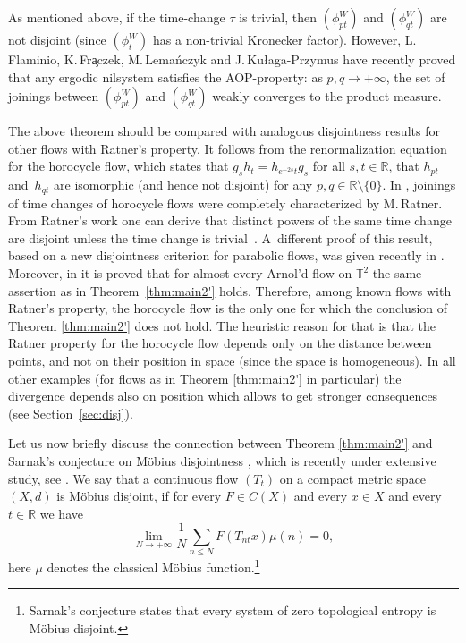 \documentclass[10pt]{amsart}
\theoremstyle{definition}
\theoremstyle{plain}
\newcommand\RR{\mathbb{R}}
\newcommand\TT{\mathbb{T}}
\begin{document}
As mentioned above, if the time-change $\tau$
is trivial, then $(\phi_{pt}^{W})$ and $(\phi_{qt}^{W})$ are not disjoint (since $(\phi_t^W)$ has a non-trivial Kronecker factor). However, L.\,Flaminio, K.\,Fr{\selectfont\c{a}}czek, M.\,Lema{\'n}czyk and J.\,Ku{\l}aga-Przymus \cite{FFKL} have recently proved that any ergodic nilsystem satisfies the AOP-property: as $p,q\to +\infty$, the set of joinings between $(\phi_{pt}^{W})$ and $(\phi_{qt}^{W})$ weakly converges to the product measure.

The above theorem should be compared with analogous disjointness results for other flows with Ratner's property. It follows from the renormalization equation for the horocycle flow, which states that $g_sh_t=h_{e^{-2s}t}g_s$ for all $s,t\in \RR$, that $h_{pt}$ and~$h_{qt}$ are isomorphic (and hence not disjoint) for any $p,q\in \RR\setminus\{0\}$. In \cite{Rat2}, joinings of time changes of horocycle flows were completely characterized by
M.\,Ratner. From Ratner's work one can derive that distinct powers of the same time change are disjoint unless the time change is trivial~\cite{FlaFo2}. A~different proof of this result, based on a new disjointness criterion for parabolic flows, was given recently in \cite{KLU}. Moreover, in \cite{KLU} it is proved that for almost every Arnol'd flow on $\TT^2$ the same assertion as in Theorem~\ref{thm:main2'} holds. Therefore, among known flows with Ratner's property, the horocycle flow is the only one for which the conclusion of Theorem \ref{thm:main2'} does not hold. The heuristic reason for that is that the Ratner property for the horocycle flow depends only on the distance between points, and not on their position in space (since the space is homogeneous). In all other examples (for flows as in Theorem \ref{thm:main2'} in particular) the divergence depends also on position which allows to get stronger consequences (see Section~\ref{sec:disj}).

Let us now briefly discuss the connection between Theorem \ref{thm:main2'} and Sarnak's conjecture on Möbius disjointness \cite{Sar}, which is recently under extensive study, see \eg \cite{FKL}. We say that a continuous flow $(T_t)$ on a compact metric space $(X,d)$ is Möbius disjoint, if for every $F\in C(X)$ and every $x\in X$ and every $t\in \RR$ we have\enlargethispage{2pt}%
\begin{equation}\label{M}
\lim_{N\to+\infty}\frac{1}{N}\sum_{n\leq N}F(T_{nt}x)\mu(n)=0,
\end{equation}
here $\mu$ denotes the classical Möbius function.\footnote{Sarnak's conjecture states that every system of zero topological entropy is Möbius disjoint.}
\end{document}
